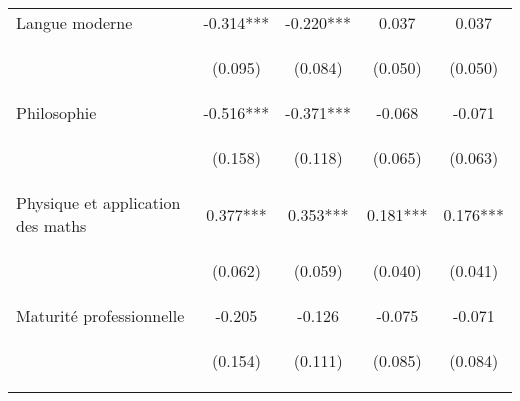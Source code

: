 \begin{center}
\begin{tabular}{lcccc}
Langue moderne & -0.314*** & -0.220*** & 0.037 & 0.037 \\
\vspace{4pt} & \begin{footnotesize}(0.095)\end{footnotesize} & \begin{footnotesize}(0.084)\end{footnotesize} & \begin{footnotesize}(0.050)\end{footnotesize} & \begin{footnotesize}(0.050)\end{footnotesize} \\
Philosophie & -0.516*** & -0.371*** & -0.068 & -0.071 \\
\vspace{4pt} & \begin{footnotesize}(0.158)\end{footnotesize} & \begin{footnotesize}(0.118)\end{footnotesize} & \begin{footnotesize}(0.065)\end{footnotesize} & \begin{footnotesize}(0.063)\end{footnotesize} \\
Physique et application des maths & 0.377*** & 0.353*** & 0.181*** & 0.176*** \\
\vspace{4pt} & \begin{footnotesize}(0.062)\end{footnotesize} & \begin{footnotesize}(0.059)\end{footnotesize} & \begin{footnotesize}(0.040)\end{footnotesize} & \begin{footnotesize}(0.041)\end{footnotesize} \\
Maturité professionnelle& -0.205 & -0.126 & -0.075 & -0.071 \\
\vspace{4pt} & \begin{footnotesize}(0.154)\end{footnotesize} & \begin{footnotesize}(0.111)\end{footnotesize} & \begin{footnotesize}(0.085)\end{footnotesize} & \begin{footnotesize}(0.084)\end{footnotesize} \\

\end{tabular}
\end{center}
